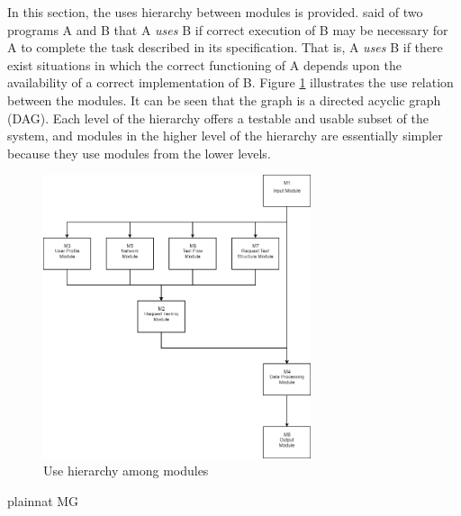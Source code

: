 \documentclass[12pt, titlepage]{article}
\begin{document}
In this section, the uses hierarchy between modules is
provided. \citet{Parnas1978} said of two programs A and B that A {\em uses} B if
correct execution of B may be necessary for A to complete the task described in
its specification. That is, A {\em uses} B if there exist situations in which
the correct functioning of A depends upon the availability of a correct
implementation of B.  Figure \ref{FigUH} illustrates the use relation between
the modules. It can be seen that the graph is a directed acyclic graph
(DAG). Each level of the hierarchy offers a testable and usable subset of the
system, and modules in the higher level of the hierarchy are essentially simpler
because they use modules from the lower levels.

\begin{figure}[H]
\centering
\includegraphics[width=0.7\textwidth]{UsesHierarchy.png}
\caption{Use hierarchy among modules}
\label{FigUH}
\end{figure}


 {plainnat}
 {MG}
\end{document}
